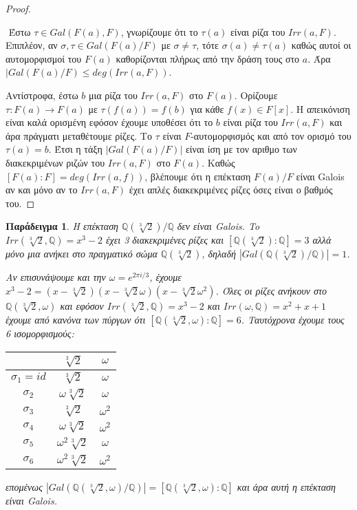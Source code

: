 \documentclass[oneside,a4paper]{article}
\newtheorem{example}{Παράδειγμα}
\newcommand {\tl}{\textlatin}
\newcommand{\Q}{\mathbb{Q}}
\begin{document}
\begin{proof} $ $

	$ $\newline
	Έστω $\tau \in Gal(F(a),F)$, γνωρίζουμε ότι το $\tau (a)$ είναι ρίζα του $Irr(a,F)$. Επιπλέον, αν $\sigma , \tau \in Gal(F(a)/F)$ με $\sigma \neq \tau$, τότε $\sigma (a) \neq \tau (a)$ καθώς αυτοί οι αυτομορφισμοί του $F(a)$ καθορίζονται πλήρως από την δράση τους στο $a$. Άρα $|Gal(F(a)/F) \leq deg\left( Irr(a,F)\right)$.

	Αντίστροφα, έστω $b$ μια ρίζα του $Irr(a,F)$ στο $F(a)$. Ορίζουμε $\tau : F(a) \rightarrow F(a)$ με $\tau(f(a)) = f(b)$ για κάθε $f(x) \in F[x]$. Η απεικόνιση είναι καλά ορισμένη εφόσον έχουμε υποθέσει ότι το $b$ είναι ρίζα του $Irr(a,F)$ και άρα πράγματι μεταθέτουμε ρίζες. Το $\tau$ είναι $F$-αυτομορφισμός και από τον ορισμό του $\tau (a) = b$. Έτσι η τάξη $|Gal(F(a)/F)|$ είναι ίση με τον αριθμο των διακεκριμένων ριζών του $Irr(a,F)$ στο $F(a)$. Καθώς $[F(a) : F] = deg(Irr(a,f))$, βλέπουμε ότι η επέκταση $F(a)/F$ είναι \tl{Galois} αν και μόνο αν το $Irr(a,F)$ έχει απλές διακεκριμένες ρίζες όσες είναι ο βαθμός του.
\end{proof}
\vspace{0.1cm}
\begin{example} Η επέκταση $\Q (\sqrt[3]{2}) / \Q$ δεν είναι \tl{Galois}. To $Irr(\sqrt[3]{2} , \Q ) = x^3 -2$ έχει 3 διακεκριμένες ρίζες και $[\Q (\sqrt[3]{2}) : \Q] = 3$ αλλά μόνο μια ανήκει στο πραγματικό σώμα $\Q (\sqrt[3]{2})$, δηλαδή $|Gal(\Q (\sqrt[3]{2}) / \Q)| = 1$.
	
	Αν επισυνάψουμε και την $\omega = e^{2\pi i /3}$, έχουμε $x^3 - 2 = (x-\sqrt[3]{2})(x-\sqrt[3]{2}\omega ) (x-\sqrt[3]{2} \omega^2)$. Όλες οι ρίζες ανήκουν στο $\Q (\sqrt[3]{2}, \omega)$ και εφόσον $Irr(\sqrt[3]{2}, \Q) = x^3 - 2$ και $Irr(\omega , \Q) = x^2 + x + 1$ έχουμε από κανόνα των πύργων ότι $[\Q (\sqrt[3]{2} , \omega) : \Q] = 6$.
	Ταυτόχρονα έχουμε τους 6 ισομορφισμούς:

	\begin{center}
		\begin{tabular}{|c|c|c |} 
		\hline
		  & $\sqrt[3]{2}$ & $\omega$  \\ 
		\hline
		$\sigma_1=id$ & $\sqrt[3]{2}$ & $\omega$ \\ 
		
		$\sigma_2$ & $\omega\sqrt[3]{2}$ & $\omega$  \\
		
		$\sigma_3$ & $\sqrt[3]{2}$ & $\omega^2$  \\
		
		$\sigma_4$ & $\omega\sqrt[3]{2}$ & $\omega^2$  \\
		
		$\sigma_5$ &$\omega^2\sqrt[3]{2}$ & $\omega$  \\
		
		$\sigma_6$ &$\omega^2\sqrt[3]{2}$ & $\omega^2$ \\
		\hline
	   \end{tabular}
	   \end{center}

	επομένως $|Gal(\Q (\sqrt[3]{2}, \omega)/ \Q )| = [\Q (\sqrt[3]{2} , \omega): \Q]$
	και άρα αυτή η επέκταση είναι \tl{Galois}.
\end{example}
\end{document}
